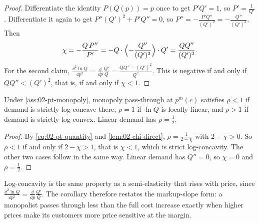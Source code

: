 \begin{proof}
Differentiate the identity $P(Q(p)) = p$ once to get $P'Q' = 1$, so $P' = \frac{1}{Q'}$. Differentiate it again
to get $P''(Q')^2 + P'Q'' = 0$, so $P'' = -\frac{P'Q''}{(Q')^2} = -\frac{Q''}{(Q')^3}$. Then
\begin{equation*}
\chi = -\frac{Q\,P''}{P'} = -Q\cdot\Bigl(-\frac{Q''}{(Q')^3}\Bigr)\cdot Q' = \frac{QQ''}{(Q')^2} .
\end{equation*}
For the second claim, $\frac{\dd^2\ln Q}{\dd p^2} = \frac{\dd}{\dd p}\frac{Q'}{Q} = \frac{QQ'' - (Q')^2}{Q^2}$. This is
negative if and only if $QQ'' < (Q')^2$, that is, if and only if $\chi < 1$.
\end{proof}

\begin{corollary}\label{cor:02-bulow-pfleiderer}
Under \cref{ass:02-pt-monopoly}, monopoly pass-through at $p^m(c)$ satisfies $\rho < 1$ if demand is strictly
log-concave there, $\rho = 1$ if $\ln Q$ is locally linear, and $\rho > 1$ if demand is strictly log-convex.
Linear demand has $\rho = \frac{1}{2}$.
\end{corollary}

\begin{proof}
By \eqref{eq:02-pt-quantity} and \cref{lem:02-chi-direct}, $\rho = \frac{1}{2 - \chi}$ with $2 - \chi > 0$. So
$\rho < 1$ if and only if $2 - \chi > 1$, that is $\chi < 1$, which is strict log-concavity. The other two cases
follow in the same way. Linear demand has $Q'' = 0$, so $\chi = 0$ and $\rho = \frac{1}{2}$.
\end{proof}

Log-concavity is the same property as a semi-elasticity that rises with price, since
$\frac{\dd^2 \ln Q}{\dd p^2} = \frac{\dd}{\dd p}\frac{Q'}{Q}$. The corollary therefore restates the markup-slope form: a
monopolist passes through less than the full cost increase exactly when higher prices make its customers more
price sensitive at the margin.

